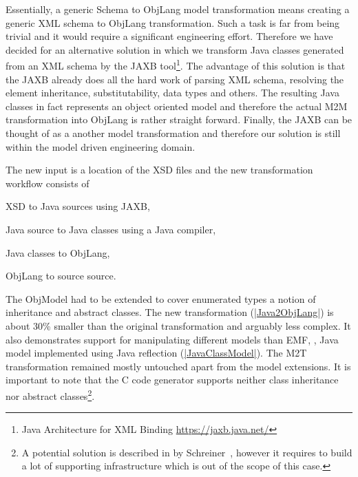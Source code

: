 \label{sec:Extension3}

\enlargethispage{20mm}

Essentially, a generic \FIXML Schema to ObjLang model transformation means creating a generic XML schema to ObjLang transformation.
Such a task is far from being trivial and it would require a significant engineering effort.
Therefore we have decided for an alternative solution in which we transform Java classes generated from an XML schema by the JAXB tool\footnote{Java Architecture for XML Binding \url{https://jaxb.java.net/}}.
The advantage of this solution is that the JAXB already does all the hard work of parsing XML schema, resolving the element inheritance, substitutability, data types and others.
The resulting Java classes in fact represents an object oriented model and therefore the actual M2M transformation into ObjLang is rather straight forward.
Finally, the JAXB can be thought of as a another model transformation and therefore our solution is still within the model driven engineering domain.

The new input is a location of the \FIXML XSD files and the new transformation workflow consists of 
\begin{inparaenum}[(1)]
	\item XSD to Java sources using JAXB,
	\item Java source to Java classes using a Java compiler,
	\item Java classes to ObjLang,
	\item ObjLang to source source.
\end{inparaenum}
%
The ObjModel had to be extended to cover enumerated types a notion of inheritance and abstract classes.
%
The new transformation (\href{https://github.com/fikovnik/ttc14-fixml-sigma/blob/master/ttc14-fixml-extension-3/src/fr/inria/spirals/sigma/ttc14/fixml/Java2ObjLang.scala}{\Scala|Java2ObjLang|}) is about 30\% smaller than the original transformation and arguably less complex.
It also demonstrates \SIGMA support for manipulating different models than EMF, \Ie, Java model implemented using Java reflection (\href{https://github.com/fikovnik/ttc14-fixml-sigma/blob/master/ttc14-fixml-extension-3/src/fr/inria/spirals/sigma/ttc14/fixml/javamm/JavaClassModel.scala}{\Scala|JavaClassModel|}).
The M2T transformation remained mostly untouched apart from the model extensions.
It is important to note that the C code generator supports neither class inheritance nor abstract classes\footnote{A potential solution is described in by Schreiner~\cite{Schreiner1993}, however it requires to build a lot of supporting infrastructure which is out of the scope of this \TTC case.}.
